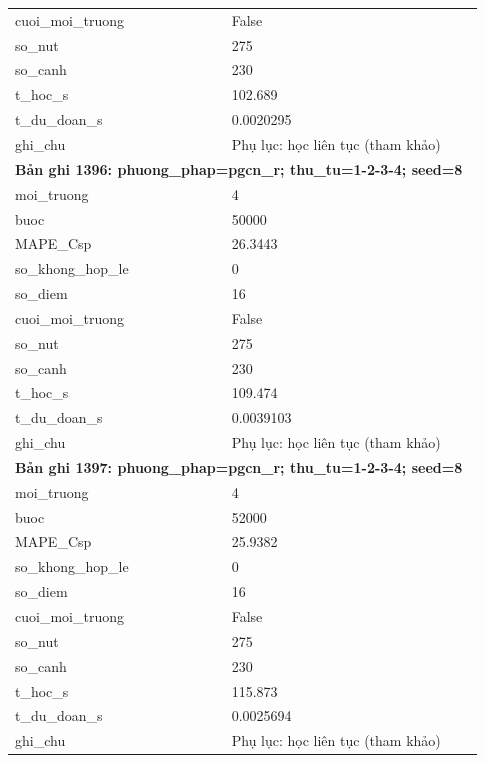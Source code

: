 \begin{longtable}{p{0.43\linewidth}p{0.50\linewidth}}
cuoi\_\allowbreak moi\_\allowbreak truong & False \\
so\_\allowbreak nut & 275 \\
so\_\allowbreak canh & 230 \\
t\_\allowbreak hoc\_\allowbreak s & 102.689 \\
t\_\allowbreak du\_\allowbreak doan\_\allowbreak s & 0.0020295 \\
ghi\_\allowbreak chu & Phụ lục: học liên tục (tham khảo) \\
\midrule
\multicolumn{2}{p{0.95\linewidth}}{\textbf{Bản ghi 1396: phuong\_phap=pgcn\_r; thu\_tu=1-2-3-4; seed=8}} \\
moi\_\allowbreak truong & 4 \\
buoc & 50000 \\
MAPE\_\allowbreak Csp & 26.3443 \\
so\_\allowbreak khong\_\allowbreak hop\_\allowbreak le & 0 \\
so\_\allowbreak diem & 16 \\
cuoi\_\allowbreak moi\_\allowbreak truong & False \\
so\_\allowbreak nut & 275 \\
so\_\allowbreak canh & 230 \\
t\_\allowbreak hoc\_\allowbreak s & 109.474 \\
t\_\allowbreak du\_\allowbreak doan\_\allowbreak s & 0.0039103 \\
ghi\_\allowbreak chu & Phụ lục: học liên tục (tham khảo) \\
\midrule
\multicolumn{2}{p{0.95\linewidth}}{\textbf{Bản ghi 1397: phuong\_phap=pgcn\_r; thu\_tu=1-2-3-4; seed=8}} \\
moi\_\allowbreak truong & 4 \\
buoc & 52000 \\
MAPE\_\allowbreak Csp & 25.9382 \\
so\_\allowbreak khong\_\allowbreak hop\_\allowbreak le & 0 \\
so\_\allowbreak diem & 16 \\
cuoi\_\allowbreak moi\_\allowbreak truong & False \\
so\_\allowbreak nut & 275 \\
so\_\allowbreak canh & 230 \\
t\_\allowbreak hoc\_\allowbreak s & 115.873 \\
t\_\allowbreak du\_\allowbreak doan\_\allowbreak s & 0.0025694 \\
ghi\_\allowbreak chu & Phụ lục: học liên tục (tham khảo) \\

\end{longtable}
